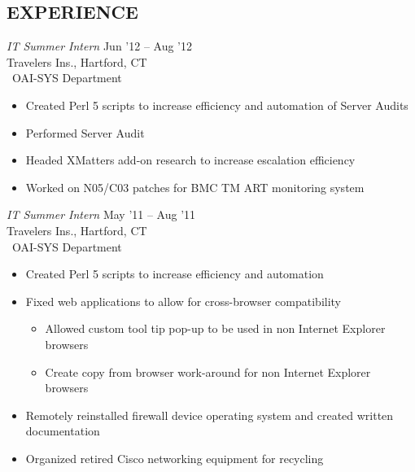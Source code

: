 \documentclass[margin]{res}
\begin{document}
\begin{resume}
\section{EXPERIENCE} {\sl IT Summer Intern} \hfill Jun '12 -- Aug '12 \\
                Travelers Ins., Hartford, CT\\\
                OAI-SYS Department
                \begin{itemize}  \itemsep -2pt %
                    \item Created Perl 5 scripts to increase efficiency and
                          automation of Server Audits
                    \item Performed Server Audit
                    \item Headed XMatters add-on research to increase escalation
                          efficiency
                    \item Worked on N05/C03 patches for BMC TM ART monitoring
                          system
                \end{itemize}
 
                {\sl IT Summer Intern} \hfill  May '11 -- Aug '11 \\
                Travelers Ins., Hartford, CT\\\
                OAI-SYS Department
                \begin{itemize}  \itemsep -2pt %
                    \item Created Perl 5 scripts to increase efficiency and 
                          automation
                    \item Fixed web applications to allow for cross-browser 
                          compatibility
                    \begin{itemize}
                        \item Allowed custom tool tip pop-up to be used in non
                              Internet Explorer \\browsers
                        \item Create copy from browser work-around for non
                              Internet Explorer \\browsers
                    \end{itemize}
                    \item Remotely reinstalled firewall device operating
                          system and created written \\documentation
                    \item Organized retired Cisco networking equipment for
                          recycling
                \end{itemize} 
 

\end{resume}
\end{document}

